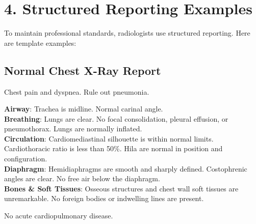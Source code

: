 \section*{4. Structured Reporting Examples}

To maintain professional standards, radiologists use structured reporting. Here are template examples:

\subsection*{Normal Chest X-Ray Report}
\begin{testbox}[Indications:]
Chest pain and dyspnea. Rule out pneumonia.
\end{testbox}
\begin{refbox}[Findings:]
\textbf{Airway}: Trachea is midline. Normal carinal angle.\\
\textbf{Breathing}: Lungs are clear. No focal consolidation, pleural effusion, or pneumothorax. Lungs are normally inflated.\\
\textbf{Circulation}: Cardiomediastinal silhouette is within normal limits. Cardiothoracic ratio is less than 50\%. Hila are normal in position and configuration.\\
\textbf{Diaphragm}: Hemidiaphragms are smooth and sharply defined. Costophrenic angles are clear. No free air below the diaphragm.\\
\textbf{Bones \& Soft Tissues}: Osseous structures and chest wall soft tissues are unremarkable. No foreign bodies or indwelling lines are present.
\end{refbox}
\begin{pearlbox}[Impression:]
No acute cardiopulmonary disease.
\end{pearlbox}

